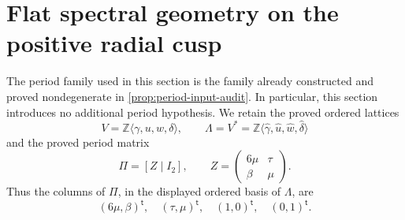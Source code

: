 \section{Flat spectral geometry on the positive radial cusp}
\label{cusp-spec-section}

The period family used in this section is the family already constructed and
proved nondegenerate in \cref{prop:period-input-audit}.  In particular, this
section introduces no additional period hypothesis.  We retain the proved
ordered lattices
\[
 V=\mathbb Z\langle\gamma,u,w,\delta\rangle,
 \qquad
 \Lambda=V^*
 =\mathbb Z\langle\widehat\gamma,\widehat u,
                         \widehat w,\widehat\delta\rangle
\]
and the proved period matrix
\[
 \Pi=[Z\mid I_2],
 \qquad
 Z=\begin{pmatrix}6\mu&\tau\\ \beta&\mu\end{pmatrix}.
\]
Thus the columns of \(\Pi\), in the displayed ordered basis of \(\Lambda\),
are
\[
 (6\mu,\beta)^{\mathsf t},\quad
 (\tau,\mu)^{\mathsf t},\quad
 (1,0)^{\mathsf t},\quad
 (0,1)^{\mathsf t}.
\]

